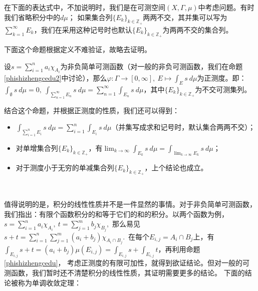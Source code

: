 \documentclass[color=green,thmcnt=section,lang=cn,12pt]{elegantbook}
\numberwithin{equation}{section}%
\numberwithin{figure}{section}%
\newcommand{\ZZ}{\mathbb{Z}}
\newcommand{\csf}[1]{\{#1_k\}_{k\in \ZZ_+}} %
\newcommand{\cs}[1]{\sum_{#1=1}^{\infty}} %
\newcommand{\jd}[1]{#1=\sum_{i=1}^{n}a_i\chi_{A_i}} %
\begin{document}
在下面的表达式中，不加说明时，我们是在可测空间$(X,\Gamma,\mu)$中考虑问题。有时我们省略积分中的$d\mu$；
如果集合列$\csf{E}$两两不交，其并集可以写为$\cs{k}E_k$，我们在采用这种记号时也默认$\csf{E}$为两两不交的集合列。


下面这个命题根据定义不难验证，故略去证明。
\begin{proposition}\label{phishizhengcedu}
    设$\jd{s}$为非负简单可测函数（对一般的非负可测函数，我们在命题\ref{phishizhengcedu2}中讨论），那么$\varphi:\Gamma\to [0,\infty],\ E\mapsto \int_{E}s\ d\mu$为正测度。即：
    $\int_{\emptyset}s\ d\mu=0,\ \int_{\cs{n}E_n}s\ d\mu=\cs{n}\int_{E_n}s\ d\mu$，其中$\csf{E}$为不交可测集列。
\end{proposition}

结合这个命题，并根据正测度的性质，我们还可以得到：
    \begin{itemize}
        \item $\int_{\sum_{i=1}^{n}E_i}s\ d\mu=\sum_{i=1}^{n}\int_{E_i}s\ d\mu$（并集写成求和记号时，默认集合两两不交）；
        \item 对单增集合列$\csf{E}$，有$\lim_{k\to \infty}\int_{E_k}s \ d\mu=\int_{\lim_{k\to \infty}E_k}s \ d\mu$；
        \item 对于测度小于无穷的单减集合列$\csf{E}$，上个结论也成立。
    \end{itemize}
\,


值得说明的是，积分的线性性质并不是一件显然的事情。对于非负简单可测函数，我们指出：有限个函数积分的和等于它们的和的积分。以两个函数为例，
$\jd{s},\ t=\sum_{j=1}^{m}b_j\chi_{B_j}$,\ 那么易见$s+t=\sum_{i=1}^{n}\sum_{j=1}^{m}(a_i+b_j)\chi_{A_i\cap B_j}$.\ 
在每个$E_{i,j}=A_i\cap B_j$上，有$\int_{E_{i,j}}s+t=(a_i+b_j)\mu(E_{i,j})=\int_{E_{i,j}}s+\int_{E_{i,j}}t$，再利用命题\ref{phishizhengcedu}，
考虑正测度的有限可加性，就得到欲证结论。但对一般的可测函数，我们暂时还不清楚积分的线性性质，其证明需要更多的结论。
下面的结论被称为单调收敛定理：
\end{document}
